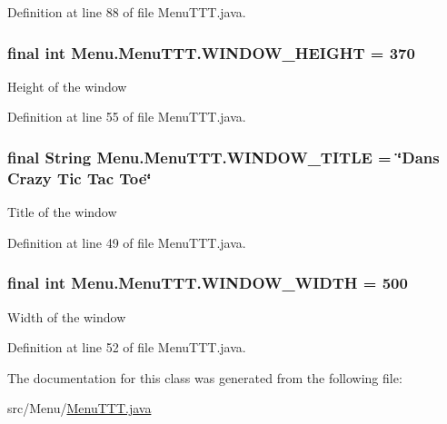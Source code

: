 Definition at line 88 of file Menu\+T\+T\+T.\+java.

\hypertarget{class_menu_1_1_menu_t_t_t_a5f9a3dacb45dd6f4f1749aa86d1b1154}{}
\subsubsection[{W\+I\+N\+D\+O\+W\+\_\+\+H\+E\+I\+G\+H\+T}]{\setlength{\rightskip}{0pt plus 5cm}final int Menu.\+Menu\+T\+T\+T.\+W\+I\+N\+D\+O\+W\+\_\+\+H\+E\+I\+G\+H\+T = 370\hspace{0.3cm}{\ttfamily [private]}}\label{class_menu_1_1_menu_t_t_t_a5f9a3dacb45dd6f4f1749aa86d1b1154}
Height of the window 

Definition at line 55 of file Menu\+T\+T\+T.\+java.

\hypertarget{class_menu_1_1_menu_t_t_t_a415b411bb82c4159d053e2e3a87a9061}{}
\subsubsection[{W\+I\+N\+D\+O\+W\+\_\+\+T\+I\+T\+L\+E}]{\setlength{\rightskip}{0pt plus 5cm}final String Menu.\+Menu\+T\+T\+T.\+W\+I\+N\+D\+O\+W\+\_\+\+T\+I\+T\+L\+E = \char`\"{}Dans Crazy Tic Tac Toe\char`\"{}\hspace{0.3cm}{\ttfamily [private]}}\label{class_menu_1_1_menu_t_t_t_a415b411bb82c4159d053e2e3a87a9061}
Title of the window 

Definition at line 49 of file Menu\+T\+T\+T.\+java.

\hypertarget{class_menu_1_1_menu_t_t_t_a07f18d5ed40cd020290f7cb16ffadca8}{}
\subsubsection[{W\+I\+N\+D\+O\+W\+\_\+\+W\+I\+D\+T\+H}]{\setlength{\rightskip}{0pt plus 5cm}final int Menu.\+Menu\+T\+T\+T.\+W\+I\+N\+D\+O\+W\+\_\+\+W\+I\+D\+T\+H = 500\hspace{0.3cm}{\ttfamily [private]}}\label{class_menu_1_1_menu_t_t_t_a07f18d5ed40cd020290f7cb16ffadca8}
Width of the window 

Definition at line 52 of file Menu\+T\+T\+T.\+java.



The documentation for this class was generated from the following file\+:\begin{DoxyCompactItemize}
\item 
src/\+Menu/\hyperlink{_menu_t_t_t_8java}{Menu\+T\+T\+T.\+java}\end{DoxyCompactItemize}
